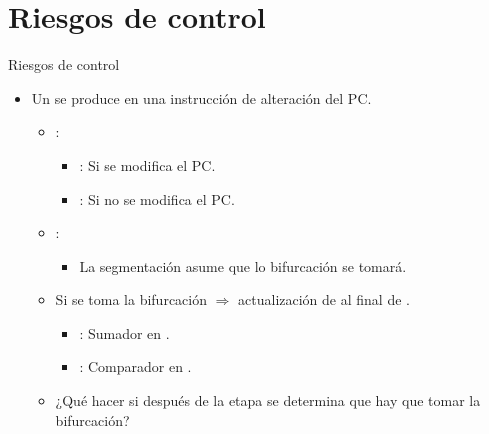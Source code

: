 \section{Riesgos de control}

\begin{frame}[t]{Riesgos de control}
\begin{itemize}
  \item Un  se produce en una 
        instrucción de alteración del PC.

    \begin{itemize}
      \item {}:
        \begin{itemize}
          \item {}: Si se modifica el PC.
          \item {}: Si no se modifica el PC.
        \end{itemize}

      \item {}:
        \begin{itemize}
          \item La segmentación asume que lo bifurcación  se tomará.
        \end{itemize}

      \item Si se toma la bifurcación $\Rightarrow$ actualización de  al final de .
        \begin{itemize}
          \item {}: Sumador en .
          \item {}: Comparador en .
        \end{itemize}

      \item ¿Qué hacer si después de la etapa  se determina que 
             hay que tomar la bifurcación?
    \end{itemize}
\end{itemize}
\end{frame}

